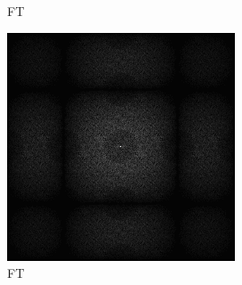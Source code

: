\begin{figure}[H]
\begin{tcolorbox}[boxrule=4pt,sharp corners=downhill,title=Szene unter Kamerabewegung, fonttitle=\bfseries]
\begin{subfigure}[b]{0.2\linewidth}
      \caption{FT}
      \label{pic:TemporalRepr_3_FFT}
    \end{subfigure}
    \begin{subfigure}[b]{0.2\linewidth}
        \includegraphics[width=\linewidth]{content/TemporalerAlg/Bilder/Reprojection/TemporalRepr/Ausschnitte/Ausschnitt4_FFT.png}
        \caption{FT}
        \label{pic:TemporalRepr_4_FFT}
    \end{subfigure}
    \begin{subfigure}[b]{0.2\linewidth}

\end{subfigure}
\end{tcolorbox}
\end{figure}
